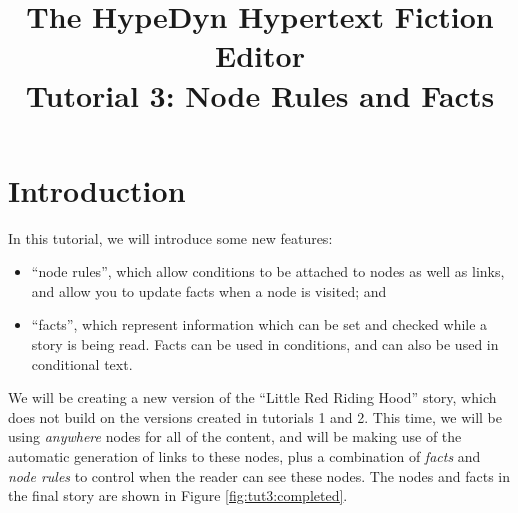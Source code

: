\documentclass{article}
\begin{document}
\title{The HypeDyn Hypertext Fiction Editor\\Tutorial 3: Node Rules and Facts}
\date{}

\onecolumn
\maketitle

\tableofcontents

\section{Introduction}
In this tutorial, we will introduce some new features:

\begin{itemize}
  \item ``node rules'', which allow conditions to be attached to nodes as well
  as links, and allow you to update facts when a node is visited; and
  \item ``facts'', which represent information which can be set and checked
  while a story is being read. Facts can be used in conditions, and can also be
  used in conditional text.
\end{itemize}



\noindent We will be creating a new version of the ``Little Red Riding Hood''
story, which does not build on the versions created in tutorials 1 and 2. This
time, we will be using \textit{anywhere} nodes for all of the content, and will
be making use of the automatic generation of links to these nodes, plus a
combination of \textit{facts} and \textit{node rules} to control when the reader
can see these nodes. The nodes and facts in the final story are shown in Figure
\ref{fig:tut3:completed}.
\end{document}
